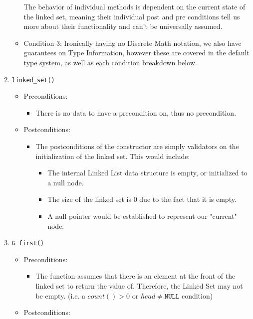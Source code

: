 \documentclass{article}
\newcommand{\NULL}{\texttt{NULL}}
\begin{document}
\begin{enumerate}
\begin{itemize}
        The behavior of individual methods is dependent on the current state of the linked set, meaning their individual post and pre conditions tell us more about their functionality and can't be universally assumed.
        \item Condition 3: Ironically having no Discrete Math notation, we also have guarantees on Type Information, however these are covered in the default type system, as well as each condition breakdown below.
    \end{itemize}
    \item \texttt{linked\_set()}
    \begin{itemize}
        \item Preconditions:
        \begin{itemize}
            \item There is no data to have a precondition on, thus no precondition.
        \end{itemize}
        \item Postconditions:
        \begin{itemize}
            \item The postconditions of the constructor are simply validators on the initialization of the linked set. This would include:
            \begin{itemize}
                \item The internal Linked List data structure is empty, or initialized to a null node.
                \item The size of the linked set is 0 due to the fact that it is empty.
                \item A null pointer would be established to represent our "current" node.
            \end{itemize}
        \end{itemize}
    \end{itemize}
    \item \texttt{G first()}
    \begin{itemize}
        \item Preconditions:
        \begin{itemize}
            \item The function assumes that there is an element at the front of the linked set to return the value of. Therefore, the Linked Set may not be empty. (i.e. a $count() > 0$ or $head \neq \NULL$ condition)
        \end{itemize}
        \item Postconditions:

\end{itemize}
\end{enumerate}
\end{document}

